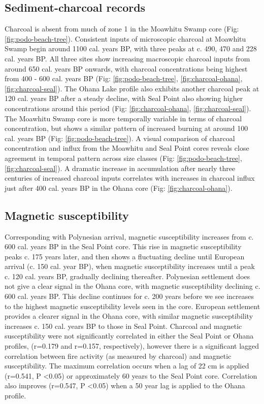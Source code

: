 \documentclass{article}
\begin{document}
\subsection{Sediment-charcoal records}

Charcoal is absent from much of zone 1 in the Moawhitu Swamp core (Fig: \ref{fig:podo-beach-tree}).  Consistent inputs of microscopic charcoal at Moawhitu Swamp begin around 1100 cal. years BP, with three peaks at c. 490, 470 and 228 cal. years BP. All three sites show increasing macroscopic charcoal inputs from around 650 cal. years BP onwards, with charcoal concentrations being highest from  400 - 600 cal. years BP (Fig: \ref{fig:podo-beach-tree}, \ref{fig:charcoal-ohana}, \ref{fig:charcoal-seal}).  The Ohana Lake profile also exhibits another charcoal peak at 120 cal. years BP after a steady decline, with Seal Point also showing higher concentrations around this period (Fig: \ref{fig:charcoal-ohana}, \ref{fig:charcoal-seal}).  The Moawhitu Swamp core is more temporally variable in terms of charcoal concentration, but shows a similar pattern of increased burning at around 100 cal. years BP (Fig: \ref{fig:podo-beach-tree}).  A visual comparison of charcoal concentration and influx from the Moawhitu and Seal Point cores reveals close agreement in temporal pattern across size classes (Fig: \ref{fig:podo-beach-tree}, \ref{fig:charcoal-seal}).  A dramatic increase in accumulation after nearly three centuries of increased charcoal inputs correlates with increases in charcoal influx just after 400 cal. years BP in the Ohana core (Fig: \ref{fig:charcoal-ohana}).    


\subsection{Magnetic susceptibility} 

Corresponding with Polynesian arrival, magnetic susceptibility increases  from c. 600 cal. years BP in the Seal Point core. This rise in magnetic susceptibility peaks c. 175 years later, and then shows a fluctuating decline until European arrival (c. 150 cal. year BP), when magnetic susceptibility increases until a peak c. 120 cal. years BP, gradually declining thereafter.  Polynesian settlement does not give a clear signal in the Ohana core, with magnetic susceptibility declining c. 600 cal. years BP. This decline continues for c. 200 years before we see increases to the highest magnetic susceptibility levels seen in the core. European settlement provides a clearer signal in the Ohana core, with similar magnetic susceptibility increases c. 150 cal. years BP to those in Seal Point.  Charcoal and magnetic susceptibility were not significantly correlated in either the Seal Point or Ohana profiles, (r=0.179 and r=0.157, respectively), however there is a significant lagged correlation between fire activity (as measured by charcoal) and magnetic susceptibility. The maximum correlation occurs when a lag of 22 cm is applied (r=0.541, P <0.05) or approximately 60 years to the Seal Point core.  Correlation also improves (r=0.547, P <0.05) when a 50 year lag is applied to the Ohana profile.       
\end{document}
